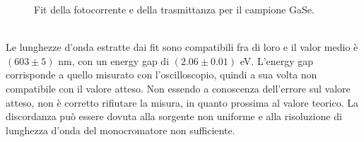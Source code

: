 \documentclass[11pt]{article} %
\begin{document}
\begin{figure}[!h]
\centering
\caption{Fit della fotocorrente e della trasmittanza per il campione GaSe.}
\end{figure}
\\Le lunghezze d'onda estratte dai fit sono compatibili fra di loro e il valor medio è $\left(603\pm5\right)$ nm, con un energy gap di $\left(2.06\pm0.01\right)$ eV. L'energy gap corrisponde a quello misurato con l'oscilloscopio, quindi a sua volta non compatibile con il valore atteso. Non essendo a conoscenza dell'errore sul valore atteso, non è corretto rifiutare la misura, in quanto prossima al valore teorico. La discordanza può essere dovuta alla sorgente non uniforme e alla risoluzione di lunghezza d'onda del monocromatore non sufficiente.
\end{document}
